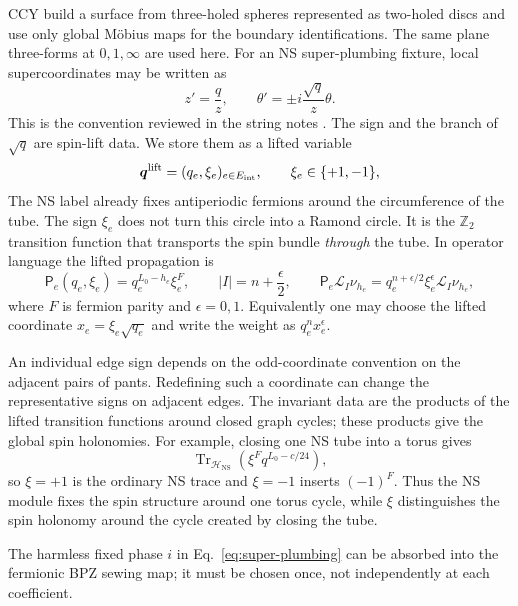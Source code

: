 \documentclass[11pt]{article}
\newcommand{\NS}{\mathrm{NS}}
\begin{document}
CCY build a surface from three-holed spheres represented as two-holed discs
and use only global M\"obius maps for the boundary identifications.  The same
plane three-forms at \(0,1,\infty\) are used here.  For an NS super-plumbing
fixture, local supercoordinates may be written as
\begin{equation}
 z'=\frac qz,
 \qquad
 \theta'=\pm i\frac{\sqrt q}{z}\theta.
 \label{eq:super-plumbing}
\end{equation}
This is the convention reviewed in the string notes
\cite{YinFoundationsStringTheory}.  The sign and the branch of \(\sqrt q\)
are spin-lift data.  We store them as a lifted variable
\begin{equation}
 \bm q^{\rm lift}=(q_e,\xi_e)_{e\in E_{\rm int}},
 \qquad \xi_e\in\{+1,-1\},
 \label{eq:lifted-q}
\end{equation}
The NS label already fixes antiperiodic fermions around the circumference of
the tube.  The sign \(\xi_e\) does not turn this circle into a Ramond circle.
It is the \(\mathbb Z_2\) transition function that transports the spin bundle
\emph{through} the tube.  In operator language the lifted propagation is
\begin{equation}
 \mathsf P_e(q_e,\xi_e)=q_e^{L_0-h_e}\xi_e^F,
 \qquad
 |I|=n+\frac\epsilon2,
 \qquad
 \mathsf P_e\mathcal L_I\nu_{h_e}
 =q_e^{n+\epsilon/2}\xi_e^\epsilon
  \mathcal L_I\nu_{h_e},
 \label{eq:lifted-ns-propagation}
\end{equation}
where \(F\) is fermion parity and \(\epsilon=0,1\).  Equivalently one may
choose the lifted coordinate \(x_e=\xi_e\sqrt{q_e}\) and write the weight as
\(q_e^n x_e^\epsilon\).

An individual edge sign depends on the odd-coordinate convention on the
adjacent pairs of pants.  Redefining such a coordinate can change the
representative signs on adjacent edges.  The invariant data are the products
of the lifted transition functions around closed graph cycles; these products
give the global spin holonomies.  For example, closing one NS tube into a
torus gives
\begin{equation}
 \operatorname{Tr}_{\mathcal H_{\NS}}
 \!\left(\xi^Fq^{L_0-c/24}\right),
 \label{eq:torus-spin-lift-trace}
\end{equation}
so \(\xi=+1\) is the ordinary NS trace and \(\xi=-1\) inserts
\((-1)^F\).  Thus the NS module fixes the spin structure around one torus
cycle, while \(\xi\) distinguishes the spin holonomy around the cycle created
by closing the tube.

The harmless fixed phase \(i\) in Eq.~\eqref{eq:super-plumbing} can be
absorbed into the fermionic BPZ sewing map; it must be chosen once, not
independently at each coefficient.
\end{document}
